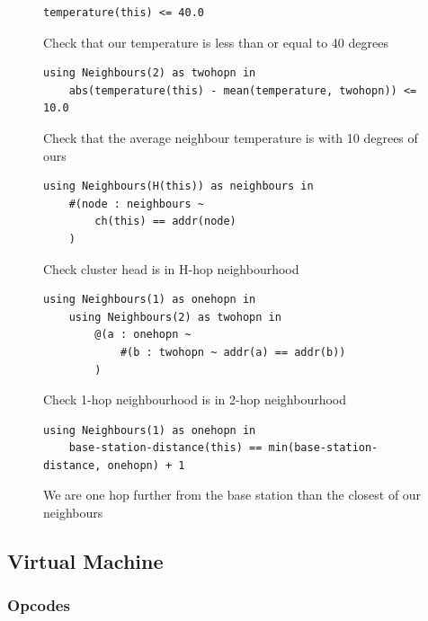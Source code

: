\begin{figure}[H]
\begin{verbatim}
temperature(this) <= 40.0
\end{verbatim}
\caption{Check that our temperature is less than or equal to 40 degrees}
\end{figure}

\begin{figure}[H]
\begin{verbatim}
using Neighbours(2) as twohopn in
    abs(temperature(this) - mean(temperature, twohopn)) <= 10.0
\end{verbatim}
\caption{Check that the average neighbour temperature is with 10 degrees of ours}
\end{figure}


\begin{figure}[H]
\begin{verbatim}
using Neighbours(H(this)) as neighbours in
    #(node : neighbours ~
        ch(this) == addr(node)
    )
\end{verbatim}
\caption{Check cluster head is in H-hop neighbourhood}
\end{figure}



\begin{figure}[H]
\begin{verbatim}
using Neighbours(1) as onehopn in
    using Neighbours(2) as twohopn in
        @(a : onehopn ~
            #(b : twohopn ~ addr(a) == addr(b))
        )
\end{verbatim}
\caption{Check 1-hop neighbourhood is in 2-hop neighbourhood}
\end{figure}


\begin{figure}[H]
\begin{verbatim}
using Neighbours(1) as onehopn in
    base-station-distance(this) == min(base-station-distance, onehopn) + 1
\end{verbatim}
\caption{We are one hop further from the base station than the closest of our neighbours}
\end{figure}


\subsection{Virtual Machine}

\subsubsection{Opcodes}

